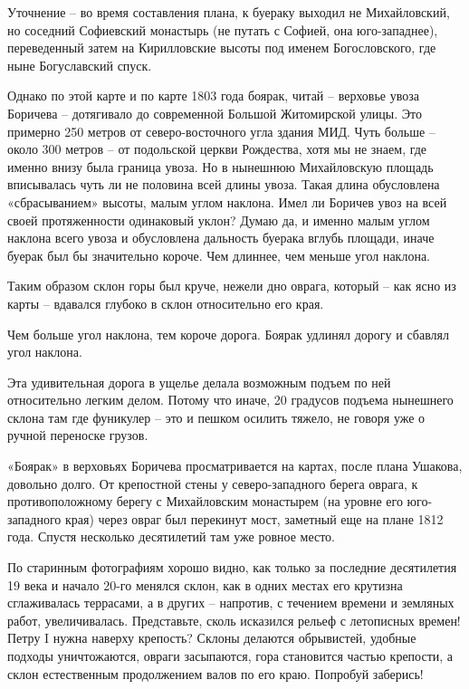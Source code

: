 Уточнение – во время составления плана, к буераку выходил не Михайловский, но соседний Софиевский монастырь (не путать с Софией, она юго-западнее), переведенный затем на Кирилловские высоты под именем Богословского, где ныне Богуславский спуск.

Однако по этой карте и по карте 1803 года боярак, читай – верховье увоза Боричева – дотягивало до современной Большой Житомирской улицы. Это примерно 250 метров от северо-восточного угла здания МИД. Чуть больше – около 300 метров – от подольской церкви Рождества, хотя мы не знаем, где именно внизу была граница увоза. Но в нынешнюю Михайловскую площадь вписывалась чуть ли не половина всей длины увоза. Такая длина обусловлена «сбрасыванием» высоты, малым углом наклона. Имел ли Боричев увоз на всей своей протяженности одинаковый уклон? Думаю да, и именно малым углом наклона всего увоза и обусловлена дальность буерака вглубь площади, иначе буерак был бы значительно короче. Чем длиннее, чем меньше угол наклона.

Таким образом склон горы был круче, нежели дно оврага, который – как ясно из карты – вдавался глубоко в склон относительно его края. 

Чем больше угол наклона, тем короче дорога. Боярак удлинял дорогу и сбавлял угол наклона. 

Эта удивительная дорога в ущелье делала возможным подъем по ней относительно легким делом. Потому что иначе, 20 градусов подъема нынешнего склона там где фуникулер – это и пешком осилить тяжело, не говоря уже о ручной переноске грузов.


«Боярак» в верховьях Боричева просматривается на картах, после плана Ушакова, довольно долго. От крепостной стены у северо-западного берега оврага, к противоположному берегу с Михайловским монастырем (на уровне его юго-западного края) через овраг был перекинут мост, заметный еще на плане 1812 года. Спустя несколько десятилетий там уже ровное место.

По старинным фотографиям хорошо видно, как только за последние десятилетия 19 века и начало 20-го менялся склон, как в одних местах его крутизна сглаживалась террасами, а в других – напротив, с течением времени и земляных работ, увеличивалась. Представьте, сколь исказился рельеф с летописных времен! Петру I нужна наверху крепость? Склоны делаются обрывистей, удобные подходы уничтожаются, овраги засыпаются, гора становится частью крепости, а склон естественным продолжением валов по его краю. Попробуй заберись! 

